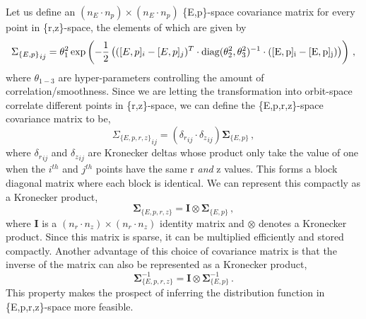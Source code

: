 Let us define an $(n_E \cdot n_p) \times (n_E \cdot n_p)$ \{E,p\}-space covariance matrix for every point in \{r,z\}-space, the elements of which are given by
\begin{equation}\label{eq:ep_covariance}
    {\Sigma_{\{E,p\}}}_{ij} = \theta_1^2 \exp \left (-\frac{1}{2}\left ( ([E,p]_i - [E, p]_j)^T\cdot \rm{diag}(\theta_2^2,\theta_3^2)^{-1} \cdot ([E, p]_i - [E, p]_j)\right ) \right )\,,
\end{equation}
where $\theta_{1-3}$ are hyper-parameters controlling the amount of correlation/smoothness. 
Since we are letting the transformation into orbit-space correlate different points in \{r,z\}-space, we can define the \{E,p,r,z\}-space covariance matrix to be, 
\begin{equation}\label{eq:eprz_covariance}
    {\Sigma_{\{E,p,r,z\}}}_{ij} = ({\delta_r}_{ij} \cdot {\delta_z}_{ij}) \mathbf{\Sigma}_{\{E,p\}}\,,
\end{equation}
where ${\delta_r}_{ij}$ and ${\delta_z}_{ij}$ are Kronecker deltas whose product only take the value of one when the $i^{th}$ and $j^{th}$ points have the same r \emph{and} z values. This forms a block diagonal matrix where each block is identical. We can represent this compactly as a Kronecker product,
\begin{equation}\label{eq:eprz_covariance_kron}
    \mathbf{\Sigma}_{\{E,p,r,z\}} = \mathbf{I} \otimes \mathbf{\Sigma}_{\{E,p\}}\,,
\end{equation}
where $\mathbf{I}$ is a $(n_r \cdot n_z) \times (n_r \cdot n_z)$ identity matrix and $\otimes$ denotes a Kronecker product. Since this matrix is sparse, it can be multiplied efficiently and  stored compactly.
Another advantage of this choice of covariance matrix is that the inverse of the matrix can also be represented as a Kronecker product,
\begin{equation}\label{eq:block_diag_inv}
    \mathbf{\Sigma}_{\{E,p,r,z\}}^{-1} = \mathbf{I} \otimes \mathbf{\Sigma}_{\{E,p\}}^{-1} \,.
\end{equation}
This property makes the prospect of inferring the distribution function in \{E,p,r,z\}-space more feasible.

